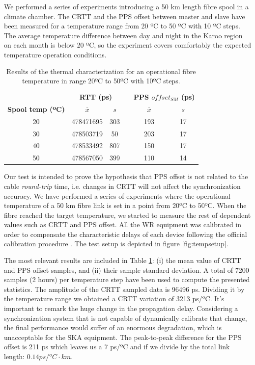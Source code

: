 We performed a series of experiments introducing a 50 km length fibre spool in 
a climate chamber. The CRTT and the PPS offset between master and slave have 
been measured for a temperature range from 20 ºC to 50 ºC with 10 ºC steps. 
The average temperature difference between day and night in the Karoo region on 
each month is below 20 ºC, so the experiment covers comfortably the expected 
temperature operation conditions.

\begin{table}\centering
	\begin{tabular}{@{} cccccc@{}}%
		& \multicolumn{2}{c}{\bfseries{RTT (ps)}} & &
		\multicolumn{2}{c}{\bfseries{PPS $offset_{SM}$ (ps)}} \\
		\cmidrule(l){2-3}  \cmidrule{5-6}
		\textbf{Spool temp (ºC)} & $\overline{x}$ & $s$ & & $\overline{x}$ 
		& $s$ \\ \midrule
		\small{20} & 478471695 & 303 & & 193 & 17 \\
		\small{30} & 478503719 & 50  & & 203 & 17 \\
		\small{40} & 478533492 & 807 & & 150 & 17 \\
		\small{50} & 478567050 & 399 & & 110 & 14 \\
		\bottomrule
	\end{tabular}
	\caption{Results of the thermal characterization for an operational fibre 
		temperature in range 20ºC to 50ºC with 10ºC steps.}
	\label{tab:temp}
\end{table}

Our test is intended to prove the hypothesis that PPS offset is not related to 
the cable \textit{round-trip} time, i.e. changes in CRTT will not affect the 
synchronization accuracy. We have performed a series of experiments where the 
operational temperature of a 50 km fibre link is set in a point from 20ºC to 
50ºC. When the fibre reached the target temperature, we started to measure the 
rest of dependent values such as CRTT and PPS offset. All the WR equipment was 
calibrated in order to compensate the characteristic delays of each device 
following the official calibration procedure \cite{man:calib}.  The test setup 
is depicted in figure \ref{fig:tempsetup}.

The most relevant results are included in Table \ref{tab:temp}: (i) the mean 
value of CRTT and PPS offset samples, and (ii) their sample standard deviation. 
A total of 7200 samples (2 hours) per temperature step have been used to 
compute the presented statistics. The amplitude of the CRTT sampled data is 
96496 ps. Dividing it by the temperature range we obtained a CRTT variation of 
3213 ps/ºC. It's important to remark the huge change in the propagation delay. 
Considering a synchronization system that is not capable of dynamically 
calibrate that change, the final performance would suffer of an enormous 
degradation, which is unacceptable for the SKA equipment. The peak-to-peak 
difference for the PPS offset is 211 ps which leaves us a 7 ps/ºC and if we 
divide by the total link length: $0.14 ps/ºC \cdot km$.

